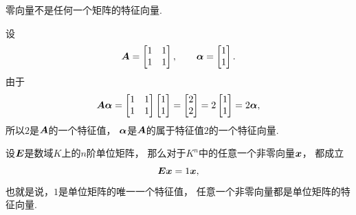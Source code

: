 \begin{remark}
零向量不是任何一个矩阵的特征向量.
\end{remark}
\begin{example}
设\begin{equation*}
	\boldsymbol{A} = \begin{bmatrix}
		1 & 1 \\ 1 & 1
	\end{bmatrix},
	\qquad
	\boldsymbol\alpha = \begin{bmatrix}
		1 \\ 1
	\end{bmatrix}.
\end{equation*}
由于\begin{equation*}
	\boldsymbol{A} \boldsymbol\alpha
	= \begin{bmatrix}
		1 & 1 \\ 1 & 1
	\end{bmatrix}
	\begin{bmatrix}
		1 \\ 1
	\end{bmatrix}
	= \begin{bmatrix}
		2 \\ 2
	\end{bmatrix}
	= 2 \begin{bmatrix}
		1 \\ 1
	\end{bmatrix}
	= 2 \boldsymbol\alpha,
\end{equation*}
所以\(2\)是\(\boldsymbol{A}\)的一个特征值，
\(\boldsymbol\alpha\)是\(\boldsymbol{A}\)的属于特征值\(2\)的一个特征向量.
\end{example}
\begin{example}
设\(\boldsymbol{E}\)是数域\(K\)上的\(n\)阶单位矩阵，
那么对于\(K^n\)中的任意一个非零向量\(\boldsymbol{x}\)，
都成立\begin{equation*}
	\boldsymbol{E} \boldsymbol{x} = 1 \boldsymbol{x},
\end{equation*}
也就是说，\(1\)是单位矩阵的唯一一个特征值，
任意一个非零向量都是单位矩阵的特征向量.
\end{example}

